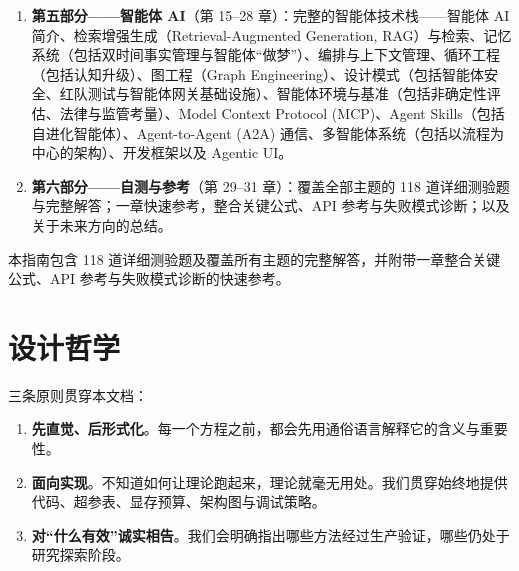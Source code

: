 \documentclass[11pt,a4paper,openany]{book}
\begin{document}
\begin{enumerate}
  \item \textbf{第五部分——智能体 AI}（第 15--28 章）：完整的智能体技术栈——智能体 AI 简介、检索增强生成（Retrieval-Augmented Generation, RAG）与检索、记忆系统（包括双时间事实管理与智能体“做梦”）、编排与上下文管理、循环工程（包括认知升级）、图工程（Graph Engineering）、设计模式（包括智能体安全、红队测试与智能体网关基础设施）、智能体环境与基准（包括非确定性评估、法律与监管考量）、Model Context Protocol (MCP)、Agent Skills（包括自进化智能体）、Agent-to-Agent (A2A) 通信、多智能体系统（包括以流程为中心的架构）、开发框架以及 Agentic UI。
  \item \textbf{第六部分——自测与参考}（第 29--31 章）：覆盖全部主题的 118 道详细测验题与完整解答；一章快速参考，整合关键公式、API 参考与失败模式诊断；以及关于未来方向的总结。
\end{enumerate}

本指南包含 118 道详细测验题及覆盖所有主题的完整解答，并附带一章整合关键公式、API 参考与失败模式诊断的快速参考。

\section*{设计哲学}
\label{design-philosophy}

三条原则贯穿本文档：

\begin{enumerate}
  \item \textbf{先直觉、后形式化}。每一个方程之前，都会先用通俗语言解释它的含义与重要性。
  \item \textbf{面向实现}。不知道如何让理论跑起来，理论就毫无用处。我们贯穿始终地提供代码、超参表、显存预算、架构图与调试策略。
  \item \textbf{对“什么有效”诚实相告}。我们会明确指出哪些方法经过生产验证，哪些仍处于研究探索阶段。
\end{enumerate}
\end{document}

